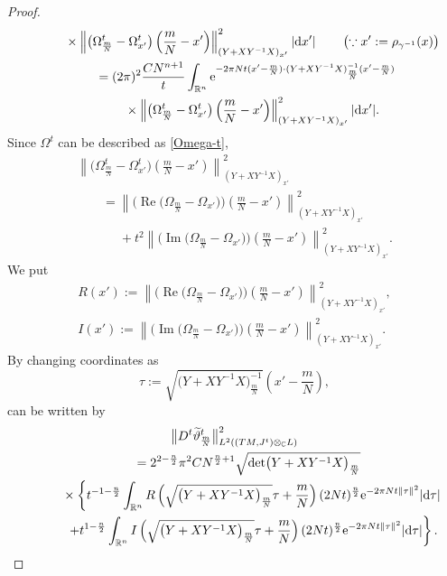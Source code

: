 \documentclass[10pt,a4paper]{amsart}
\numberwithin{equation}{section}
\newcommand{\C}{\mathbb{C}}
\newcommand{\R}{\mathbb{R}}
\renewcommand{\tilde}{\widetilde}
\newcommand{\abs}[1]{\lvert#1\rvert}
\newcommand{\norm}[1]{\lVert#1\rVert}
\def\re{\operatorname{Re}}
\def\im{\operatorname{Im}}
\begin{document}
\begin{proof}
\begin{gather*}
\phantom{\qquad=}{} \times \left\lVert \bigl( \Omega^t_{\frac{m}{N}}-\Omega^t_{x'}\bigr)\left(\frac{m}{N}-x'\right)\right\rVert ^2_{(Y+XY^{-1}X)_{x'}}\abs{{\rm d}x'}\qquad \left(\because x':=\rho_{\gamma^{-1}}(x)\right) \\
\qquad= (2\pi)^2\frac{C N^{n+1}}{t}\int_{\R^n} {\rm e}^{-2\pi Nt(x'-\frac{m}{N})\cdot ( Y+XY^{-1}X)^{-1}_{\frac{m}{N}}(x'-\frac{m}{N})}\\
\phantom{\qquad=}{} \times \left\lVert \bigl( \Omega^t_{\frac{m}{N}}-\Omega^t_{x'}\bigr)\left(\frac{m}{N}-x'\right)\right\rVert ^2_{(Y+XY^{-1}X)_{x'}}\abs{{\rm d}x'}.
\end{gather*}
Since $\Omega^t$ can be described as \eqref{Omega-t},
\begin{gather*}
\left\lVert \bigl( \Omega^t_{\frac{m}{N}}-\Omega^t_{x'}\bigr)\left(\frac{m}{N}-x'\right)\right\rVert ^2_{(Y+XY^{-1}X)_{x'}}\\
\qquad=\left\lVert \bigl(\re \bigl( \Omega_{\frac{m}{N}}-\Omega_{x'}\bigr)\bigr)\left(\frac{m}{N}-x'\right)\right\rVert ^2_{(Y+XY^{-1}X)_{x'}}\\
\phantom{\qquad=}{} +t^2\left\lVert \bigl(\im \bigl( \Omega_{\frac{m}{N}}-\Omega_{x'}\bigr)\bigr)\left(\frac{m}{N}-x'\right)\right\rVert ^2_{(Y+XY^{-1}X)_{x'}}.
\end{gather*}
We put
\begin{gather*}
R(x'):=\left\lVert \bigl(\re \bigl( \Omega_{\frac{m}{N}}-\Omega_{x'}\bigr)\bigr)\left(\frac{m}{N}-x'\right)\right\rVert ^2_{(Y+XY^{-1}X)_{x'}}, \\
I(x'):=\left\lVert \bigl(\im \bigl( \Omega_{\frac{m}{N}}-\Omega_{x'}\bigr)\bigr)\left(\frac{m}{N}-x'\right)\right\rVert ^2_{(Y+XY^{-1}X)_{x'}}.
\end{gather*}
By changing coordinates as
\[
\tau:=\sqrt{\bigl(Y+XY^{-1}X\bigr)_{\frac{m}{N}}^{-1}}\left(x'-\frac{m}{N}\right),
\]
 \smash{$\big\|D^t {\tilde \vartheta}^t_{\frac{m}{N}}\big\|_{L^2((TM, J^t)\otimes_{\C}L)}^2$} can be written by
\begin{gather*}
\big\|D^t {\tilde \vartheta}^t_{\frac{m}{N}}\big\|_{L^2((TM, J^t)\otimes_{\C}L)}^2 \\
\qquad{}
 = 2^{2-\frac{n}{2}}\pi^2 C N^{\frac{n}{2}+1}\sqrt{\det \bigl(Y+XY^{-1}X\bigr)_{\frac{m}{N}}}\\
\phantom{\qquad=}{}\times \left\{ t^{-1-\frac{n}{2}} \int_{\R^n} R\left(\sqrt{\bigl(Y+XY^{-1}X\bigr)_{\frac{m}{N}}}\tau +\frac{m}{N}\right)(2Nt)^\frac{n}{2} {\rm e}^{-2\pi Nt\norm{\tau}^2}\abs{{\rm d}\tau} \right.\\
\phantom{\qquad=}{}\left. +t^{1-\frac{n}{2}} \int_{\R^n} I\left(\sqrt{\bigl(Y+XY^{-1}X\bigr)_{\frac{m}{N}}}\tau +\frac{m}{N}\right)(2Nt)^\frac{n}{2} {\rm e}^{-2\pi Nt\norm{\tau}^2}\abs{{\rm d}\tau}\right\}.

\end{gather*}
\end{proof}
\end{document}
